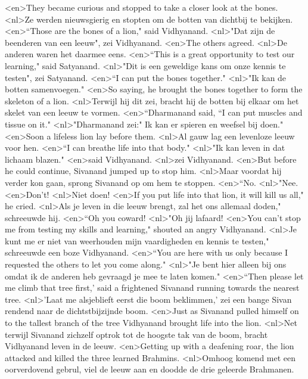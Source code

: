 <en>They became curious and stopped to take a closer look at the bones.
<nl>Ze werden nieuwsgierig en stopten om de botten van dichtbij te bekijken.
<en>“Those are the bones of a lion," said Vidhyanand.
<nl>"Dat zijn de beenderen van een leeuw", zei Vidhyanand.
<en>The others agreed.
<nl>De anderen waren het daarmee eens.
<en>“This is a great opportunity to test our learning," said Satyanand.
<nl>"Dit is een geweldige kans om onze kennis te testen", zei Satyanand.
<en>“I can put the bones together."
<nl>"Ik kan de botten samenvoegen."
<en>So saying, he brought the bones together to form the skeleton of a lion.
<nl>Terwijl hij dit zei, bracht hij de botten bij elkaar om het skelet van een leeuw te vormen.
<en>“Dharmanand said, “I can put muscles and tissue on it."
<nl>"Dharmanand zei:" Ik kan er spieren en weefsel bij doen."
<en>Soon a lifeless lion lay before them.
<nl>Al gauw lag een levenloze leeuw voor hen.
<en>“I can breathe life into that body."
<nl>"Ik kan leven in dat lichaam blazen."
<en>said Vidhyanand.
<nl>zei Vidhyanand.
<en>But before he could continue, Sivanand jumped up to stop him.
<nl>Maar voordat hij verder kon gaan, sprong Sivanand op om hem te stoppen.
<en>“No.
<nl>"Nee.
<en>Don't!
<nl>Niet doen!
<en>If you put life into that lion, it will kill us all," he cried.
<nl>Als je leven in die leeuw brengt, zal het ons allemaal doden," schreeuwde hij.
<en>“Oh you coward!
<nl>"Oh jij lafaard!
<en>You can’t stop me from testing my skills and learning," shouted an angry Vidhyanand.
<nl>Je kunt me er niet van weerhouden mijn vaardigheden en kennis te testen," schreeuwde een boze Vidhyanand.
<en>“You are here with us only because I requested the others to let you come along."
<nl>"Je bent hier alleen bij ons  omdat ik de anderen heb gevraagd  je mee te laten komen."
<en>“Then please let me climb that tree first,’ said a frightened Sivanand running towards the nearest tree.
<nl>'Laat me alsjeblieft eerst die boom beklimmen,' zei een bange Sivan rendend naar de dichtstbijzijnde boom.
<en>Just as Sivanand pulled himself on to the tallest branch of the tree Vidhyanand brought life into the lion.
<nl>Net terwijl Sivanand zichzelf optrok tot de hoogste tak van de boom, bracht Vidhyanand leven in de leeuw.
<en>Getting up with a deafening roar, the lion attacked and killed the three learned Brahmins.
<nl>Omhoog komend met een oorverdovend gebrul, viel  de leeuw aan en doodde de drie geleerde Brahmanen.
